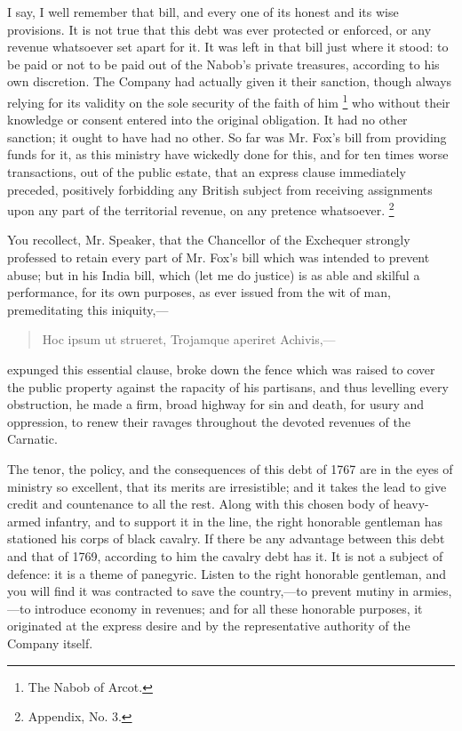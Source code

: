 I say, I well remember that bill, and every one of its honest and its wise provisions. It is not true that this debt was ever protected or enforced, or any revenue whatsoever set apart for it. It was left in that bill just where it stood: to be paid or not to be paid out of the Nabob's private treasures, according to his own discretion. The Company had actually given it their sanction, though always relying for its validity on the sole security of the faith of him
\footnote{ The Nabob of Arcot.}
 who without their knowledge or consent entered into the original obligation. It had no other sanction; it ought to have had no other. So far was Mr. Fox's bill from providing funds for it, as this ministry have wickedly done for this, and for ten times worse transactions, out of the public estate, that an express clause immediately preceded, positively forbidding any British subject from receiving assignments upon any part of the territorial revenue, on any pretence whatsoever.
\footnote{ Appendix, No. 3.}


You recollect, Mr. Speaker, that the Chancellor of the Exchequer strongly professed to retain every part of Mr. Fox's bill which was intended to prevent abuse; but in his India bill, which (let me do justice) is as able and skilful a performance, for its own purposes, as ever issued from the wit of man, premeditating this iniquity,—

\begin{verse}
Hoc ipsum ut strueret, Trojamque aperiret Achivis,—
\end{verse}

expunged this essential clause, broke down the fence which was raised to cover the public property against the rapacity of his partisans, and thus levelling every obstruction, he made a firm, broad highway for sin and death, for usury and oppression, to renew their ravages throughout the devoted revenues of the Carnatic.

The tenor, the policy, and the consequences of this debt of 1767 are in the eyes of ministry so excellent, that its merits are irresistible; and it takes the lead to give credit and countenance to all the rest. Along with this chosen body of heavy-armed infantry, and to support it in the line, the right honorable gentleman has stationed his corps of black cavalry. If there be any advantage between this debt and that of 1769, according to him the cavalry debt has it. It is not a subject of defence: it is a theme of panegyric. Listen to the right honorable gentleman, and you will find it was contracted to save the country,—to prevent mutiny in armies,—to introduce economy in revenues; and for all these honorable purposes, it originated at the express desire and by the representative authority of the Company itself.


